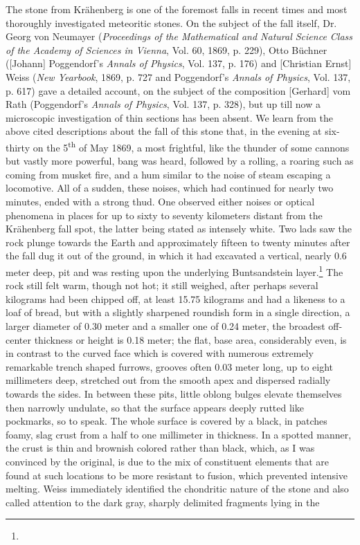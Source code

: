 \documentclass[a4paper, 12pt, oneside]{article}
\begin{document}
The stone from Krähenberg is one of the foremost falls in recent times and most thoroughly investigated meteoritic stones. On the subject of the fall itself, Dr. Georg von Neumayer (\emph{Proceedings of the Mathematical and Natural Science Class of the Academy of Sciences in Vienna}, Vol. 60, 1869, p. 229), Otto Büchner ([Johann] Poggendorf's \emph{Annals of Physics}, Vol. 137, p. 176) and [Christian Ernst] Weiss (\emph{New Yearbook}, 1869, p. 727 and Poggendorf's \emph{Annals of Physics}, Vol. 137, p. 617) gave a detailed account, on the subject of the composition [Gerhard] vom Rath (Poggendorf's \emph{Annals of Physics}, Vol. 137, p. 328), but up till now a microscopic investigation of thin sections has been absent. We learn from the above cited descriptions about the fall of this stone that, in the evening at six-thirty on the 5\textsuperscript{th} of May 1869, a most frightful, like the thunder of some cannons but vastly more powerful, bang was heard, followed by a rolling, a roaring such as coming from musket fire, and a hum similar to the noise of steam escaping a locomotive. All of a sudden, these noises, which had continued for nearly two minutes, ended with a strong thud. One observed either noises or optical phenomena in places for up to sixty to seventy kilometers distant from the Krähenberg fall spot, the latter being stated as intensely white. Two lads saw the rock plunge towards the Earth and approximately fifteen to twenty minutes after the fall dug it out of the ground, in which it had excavated a vertical, nearly 0.6 meter deep, pit and was resting upon the underlying Buntsandstein layer.\footnote{} The rock still felt warm, though not hot; it still weighed, after perhaps several kilograms had been chipped off, at least 15.75 kilograms and had a likeness to a loaf of bread, but with a slightly sharpened roundish form in a single direction, a larger diameter of 0.30 meter and a smaller one of 0.24 meter, the broadest off-center thickness or height is 0.18 meter; the flat, base area, considerably even, is in contrast to the curved face which is covered with numerous extremely remarkable trench shaped furrows, grooves often 0.03 meter long, up to eight millimeters deep, stretched out from the smooth apex and dispersed radially towards the sides.  In between these pits, little oblong bulges elevate themselves then narrowly undulate, so that the surface appears deeply rutted like pockmarks, so to speak. The whole surface is covered by a black, in patches foamy, slag crust from a half to one millimeter in thickness. In a spotted manner, the crust is thin and brownish colored rather than black, which, as I was convinced by the original, is due to the mix of constituent elements that are found at such locations to be more resistant to fusion, which prevented intensive melting. Weiss immediately identified the chondritic nature of the stone and also called attention to the dark gray, sharply delimited fragments lying in the 
\end{document}
